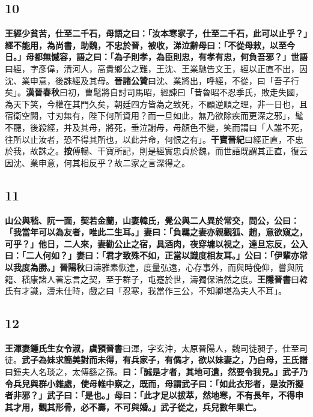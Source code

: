 \subsection*{10}

\textbf{王經少貧苦，仕至二千石，母語之曰：「汝本寒家子，仕至二千石，此可以止乎？」經不能用，為尚書，助魏，不忠於晉，被收，涕泣辭母曰：「不從母敕，以至今日。」母都無慽容，語之曰：「為子則孝，為臣則忠，有孝有忠，何負吾邪？」}{\footnotesize \textbf{世語}曰經，字彥偉，清河人，高貴鄉公之難，王沈、王業馳告文王，經以正直不出，因沈、業申意，後誅經及其母。\textbf{晉諸公贊}曰沈、業將出，呼經，不從，曰「吾子行矣」。\textbf{漢晉春秋}曰初，曹髦將自討司馬昭，經諫曰「昔魯昭不忍季氏，敗走失國，為天下笑，今權在其門久矣，朝廷四方皆為之致死，不顧逆順之理，非一日也，且宿衛空闕，寸刃無有，陛下何所資用？而一旦如此，無乃欲除疾而更深之邪」，髦不聽，後殺經，并及其母，將死，垂泣謝母，母顏色不變，笑而謂曰「人誰不死，往所以止汝者，恐不得其所也，以此并命，何恨之有」。\textbf{干寶晉紀}曰經正直，不忠於我，故誅之。\textbf{按}傅暢、干寶所記，則是經實忠貞於魏，而世語既謂其正直，復云因沈、業申意，何其相反乎？故二家之言深得之。}

\subsection*{11}

\textbf{山公與嵇、阮一面，契若金蘭，山妻韓氏，覺公與二人異於常交，問公，公曰：「我當年可以為友者，唯此二生耳。」妻曰：「負羈之妻亦親觀狐、趙，意欲窺之，可乎？」他日，二人來，妻勸公止之宿，具酒肉，夜穿墉以視之，達旦忘反，公入曰：「二人何如？」妻曰：「君才致殊不如，正當以識度相友耳。」公曰：「伊輩亦常以我度為勝。」}{\footnotesize \textbf{晉陽秋}曰濤雅素恢達，度量弘遠，心存事外，而與時俛仰，嘗與阮籍、嵇康諸人著忘言之契，至于群子，屯蹇於世，濤獨保浩然之度。\textbf{王隱晉書}曰韓氏有才識，濤未仕時，戲之曰「忍寒，我當作三公，不知卿堪為夫人不耳」。}

\subsection*{12}

\textbf{王渾妻鍾氏生女令淑，}{\footnotesize \textbf{虞預晉書}曰渾，字玄沖，太原晉陽人，魏司徒昶子，仕至司徒。}\textbf{武子為妹求簡美對而未得，有兵家子，有儁才，欲以妹妻之，乃白母，}{\footnotesize \textbf{王氏譜}曰鍾夫人名琰之，太傅繇之孫。}\textbf{曰：「誠是才者，其地可遺，然要令我見。」武子乃令兵兒與群小雜處，使母帷中察之，既而，母謂武子曰：「如此衣形者，是汝所擬者非邪？」武子曰：「是也。」母曰：「此才足以拔萃，然地寒，不有長年，不得申其才用，觀其形骨，必不壽，不可與婚。」武子從之，兵兒數年果亡。}

